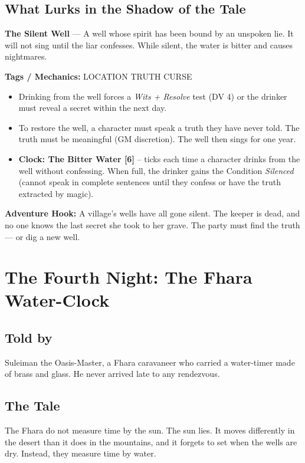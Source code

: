 \documentclass[10pt,twoside]{book}
\newcommand{\tag}[1]{\textsc{#1}}
\begin{document}
\section*{What Lurks in the Shadow of the Tale}
\begin{infobox}
\textbf{The Silent Well} --- A well whose spirit has been bound by an unspoken lie. It will not sing until the liar confesses. While silent, the water is bitter and causes nightmares.

\textbf{Tags / Mechanics:} \tag{LOCATION} \tag{TRUTH} \tag{CURSE}

\begin{itemize}
\item Drinking from the well forces a \textit{Wits + Resolve} test (DV 4) or the drinker must reveal a secret within the next day.
\item To restore the well, a character must speak a truth they have never told. The truth must be meaningful (GM discretion). The well then sings for one year.
\item \textbf{Clock: The Bitter Water [6]} -- ticks each time a character drinks from the well without confessing. When full, the drinker gains the Condition \textit{Silenced} (cannot speak in complete sentences until they confess or have the truth extracted by magic).
\end{itemize}

\textbf{Adventure Hook:} A village's wells have all gone silent. The keeper is dead, and no one knows the last secret she took to her grave. The party must find the truth --- or dig a new well.
\end{infobox}

\chapter{The Fourth Night: The Fhara Water-Clock}

\section*{Told by}
Suleiman the Oasis-Master, a Fhara caravaneer who carried a water-timer made of brass and glass. He never arrived late to any rendezvous.

\section*{The Tale}
The Fhara do not measure time by the sun. The sun lies. It moves differently in the desert than it does in the mountains, and it forgets to set when the wells are dry. Instead, they measure time by water.
\end{document}
